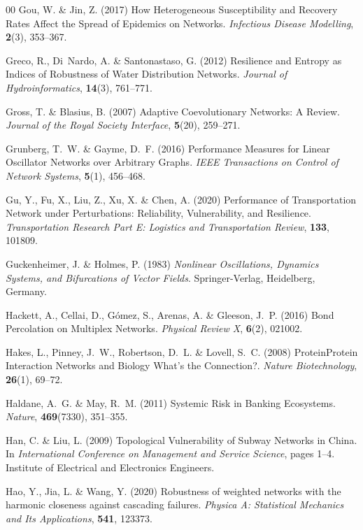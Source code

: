 \documentclass{comnet-mod}
\begin{document}
\begin{thebibliography}{00}
Gou, W. {\&} Jin, Z. (2017)  {How Heterogeneous Susceptibility and Recovery
  Rates Affect the Spread of Epidemics on Networks}. {\em {Infectious Disease
  Modelling}}, \textbf{2}(3), 353--367.

Greco, R., Di~Nardo, A. {\&} Santonastaso, G. (2012)  {Resilience and Entropy
  as Indices of Robustness of Water Distribution Networks}. {\em {Journal of
  Hydroinformatics}}, \textbf{14}(3), 761--771.

Gross, T. {\&} Blasius, B. (2007)  {Adaptive Coevolutionary Networks: {{A}}
  Review}. {\em {Journal of the Royal Society Interface}}, \textbf{5}(20),
  259--271.

Grunberg, T.~W. {\&} Gayme, D.~F. (2016)  {Performance Measures for Linear
  Oscillator Networks over Arbitrary Graphs}. {\em {IEEE Transactions on
  Control of Network Systems}}, \textbf{5}(1), 456--468.

Gu, Y., Fu, X., Liu, Z., Xu, X. {\&} Chen, A. (2020)  {Performance of
  Transportation Network under Perturbations: {{Reliability}}, Vulnerability,
  and Resilience}. {\em {Transportation Research Part E: Logistics and
  Transportation Review}}, \textbf{133}, 101809.

Guckenheimer, J. {\&} Holmes, P. (1983) {\em {Nonlinear Oscillations, Dynamics
  Systems, and Bifurcations of Vector Fields}}.
{Springer-Verlag}, {Heidelberg, Germany}.

Hackett, A., Cellai, D., G{\'o}mez, S., Arenas, A. {\&} Gleeson, J.~P. (2016)
  {Bond Percolation on Multiplex Networks}. {\em {Physical Review X}},
  \textbf{6}(2), 021002.

Hakes, L., Pinney, J.~W., Robertson, D.~L. {\&} Lovell, S.~C. (2008)
  {Protein\textendash Protein Interaction Networks and Biology \textemdash{}
  {{What}}'s the Connection?}. {\em {Nature Biotechnology}}, \textbf{26}(1),
  69--72.

Haldane, A.~G. {\&} May, R.~M. (2011)  {Systemic Risk in Banking Ecosystems}.
  {\em {Nature}}, \textbf{469}(7330), 351--355.

Han, C. {\&} Liu, L. (2009)  {Topological Vulnerability of Subway Networks in
  {{China}}}. In {\em {International Conference on Management and Service
  Science}}, pages 1--4. {Institute of Electrical and Electronics Engineers}.

Hao, Y., Jia, L. {\&} Wang, Y. (2020)  Robustness of weighted networks with the
  harmonic closeness against cascading failures. {\em {Physica A: Statistical
  Mechanics and Its Applications}}, \textbf{541}, 123373.


\end{thebibliography}
\end{document}
